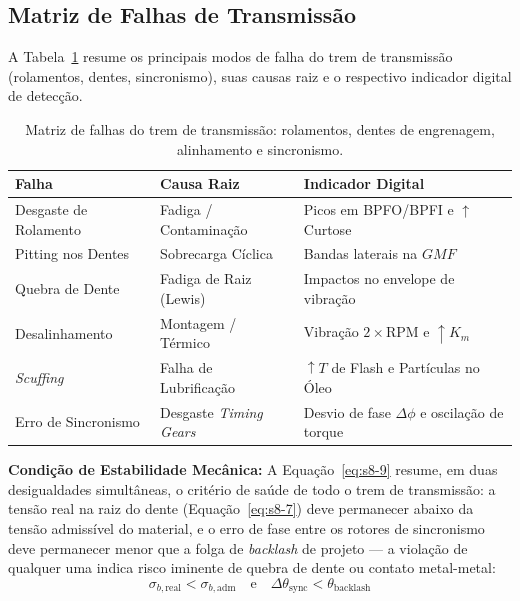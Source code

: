 \documentclass[12pt,a4paper]{article}
\numberwithin{equation}{section}
\numberwithin{table}{section}
\numberwithin{figure}{section}
\begin{document}
{	\subsection{\textbf{Matriz de Falhas de Transmissão}}
	A Tabela~\ref{tab:8-1} resume os principais modos de falha do trem de transmissão (rolamentos, dentes, sincronismo), suas causas raiz e o respectivo indicador digital de detecção.
	\begin{table}[h!tbp]
		\centering
		\small
		\renewcommand{\arraystretch}{1.5}
		\begin{tabular}{l l l}
			\toprule
			\textbf{Falha} & \textbf{Causa Raiz} & \textbf{Indicador Digital} \\ \midrule
			Desgaste de Rolamento & Fadiga / Contaminação & Picos em BPFO/BPFI e $\uparrow$ Curtose \\
			Pitting nos Dentes & Sobrecarga Cíclica & Bandas laterais na $GMF$ \\
			Quebra de Dente & Fadiga de Raiz (Lewis) & Impactos no envelope de vibração \\
			Desalinhamento & Montagem / Térmico & Vibração $2 \times \text{RPM}$ e $\uparrow K_m$ \\
			\textit{Scuffing} & Falha de Lubrificação & $\uparrow T$ de Flash e Partículas no Óleo \\
			Erro de Sincronismo & Desgaste \textit{Timing Gears} & Desvio de fase $\Delta \phi$ e oscilação de torque \\ \bottomrule
		\end{tabular}
		\caption[Matriz de falhas do trem de transmissão]{Matriz de falhas do trem de transmissão: rolamentos, dentes de engrenagem, alinhamento e sincronismo.}
		\label{tab:8-1}
	\end{table}
	
	\vspace{1em}
	\textbf{Condição de Estabilidade Mecânica:} A Equação~\eqref{eq:s8-9} resume, em duas desigualdades simultâneas, o critério de saúde de todo o trem de transmissão: a tensão real na raiz do dente (Equação~\eqref{eq:s8-7}) deve permanecer abaixo da tensão admissível do material, e o erro de fase entre os rotores de sincronismo deve permanecer menor que a folga de \textit{backlash} de projeto — a violação de qualquer uma indica risco iminente de quebra de dente ou contato metal-metal:
	\begin{equation}\label{eq:s8-9}
 \boxed{\sigma_{b, \text{real}} < \sigma_{b, \text{adm}} \quad \text{e} \quad \Delta \theta_{\text{sync}} < \theta_{\text{backlash}}}
\end{equation}

}
\end{document}
